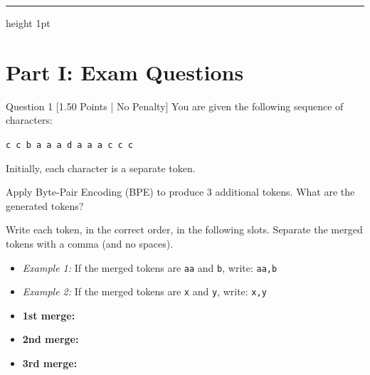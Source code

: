 \documentclass[11pt,a4paper]{article}
\begin{document}
\vspace{0.4cm}
\hrule height 1pt
\vspace{0.6cm}

\section{Part I: Exam Questions}

\begin{questionbox}{Question 1 \hfill [1.50 Points | No Penalty]}
You are given the following sequence of characters:
\begin{center}
\texttt{c c b a a a d a a a c c c}
\end{center}
Initially, each character is a separate token.

\noindent Apply Byte-Pair Encoding (BPE) to produce 3 additional tokens. What are the generated tokens?

\noindent Write each token, in the correct order, in the following slots. Separate the merged tokens with a comma (and no spaces).
\begin{itemize}[noitemsep]
    \item \textit{Example 1:} If the merged tokens are \texttt{aa} and \texttt{b}, write: \texttt{aa,b}
    \item \textit{Example 2:} If the merged tokens are \texttt{x} and \texttt{y}, write: \texttt{x,y}
\end{itemize}

\vspace{0.2cm}
\begin{itemize}[leftmargin=2em]
    \item \textbf{1st merge:} \underline{\hspace{5cm}}
    \item \textbf{2nd merge:} \underline{\hspace{5cm}}
    \item \textbf{3rd merge:} \underline{\hspace{5cm}}
\end{itemize}
\end{questionbox}

\vspace{0.3cm}
\end{document}
